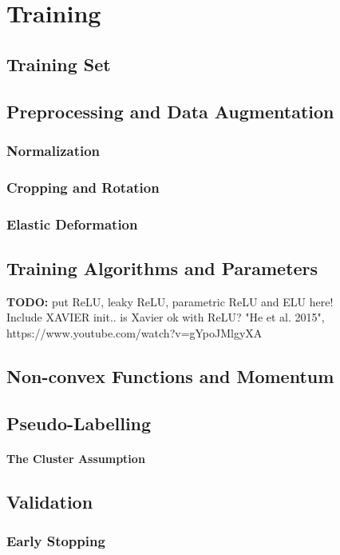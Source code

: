 \chapter{Training}

	\section{Training Set}

	\section {Preprocessing and Data Augmentation}


		\subsection{Normalization}

		\subsection{Cropping and Rotation}

		\subsection{Elastic Deformation}

	\section {Training Algorithms and Parameters}
	\textbf{TODO:} put ReLU, leaky ReLU, parametric ReLU and ELU here!\\ Include XAVIER init.. is Xavier ok with ReLU? "He et al. 2015", https://www.youtube.com/watch?v=gYpoJMlgyXA
	
	\section{Non-convex Functions and Momentum}

	\section {Pseudo-Labelling}

		\subsubsection {The Cluster Assumption}

	\section {Validation}
		
		\subsection{Early Stopping}